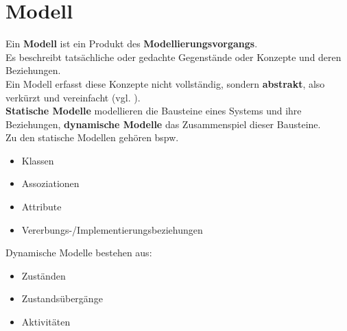 \section{Modell}



\vspace{2mm}
\begin{tcolorbox}[title=Arbeitsdefinition ``Modell``]
    Ein \textbf{Modell} ist ein Produkt des \textbf{Modellierungsvorgangs}.\\

    \noindent
    Es beschreibt tatsächliche oder gedachte Gegenstände oder Konzepte und deren Beziehungen.\\

    \noindent
    Ein Modell erfasst diese Konzepte nicht vollständig, sondern \textbf{abstrakt}, also verkürzt und vereinfacht (vgl. \cite[2]{Wed09b}).\\

    \noindent
    \textbf{Statische Modelle} modellieren die Bausteine eines Systems und ihre Beziehungen, \textbf{dynamische Modelle} das Zusammenspiel dieser Bausteine.\\
    Zu den statische Modellen gehören bspw.
    \begin{itemize}
        \item Klassen
        \item Assoziationen
        \item Attribute
        \item Vererbungs-/Implementierungsbeziehungen
    \end{itemize}
    \noindent
    Dynamische Modelle bestehen aus:
    \begin{itemize}
        \item Zuständen
        \item Zustandsübergänge
        \item Aktivitäten
    \end{itemize}
\end{tcolorbox}
\vspace{2mm}